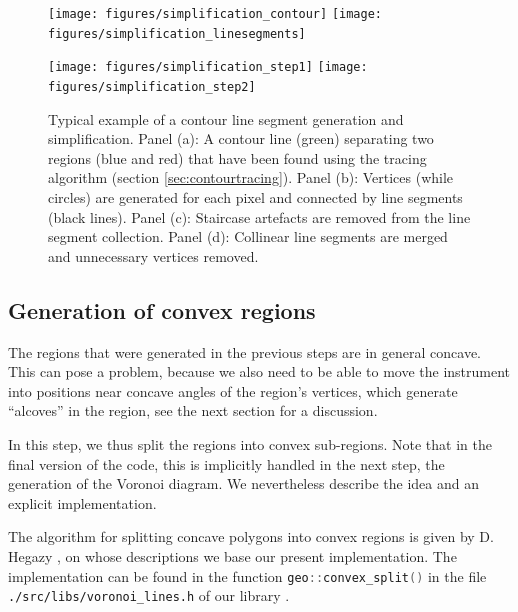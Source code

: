 \begin{figure}
	\texttt{[image: figures/simplification\_contour]}
	\hspace{0.1cm}
	\texttt{[image: figures/simplification\_linesegments]}

	\vspace{0.25cm}

	\texttt{[image: figures/simplification\_step1]}
	\hspace{0.1cm}
	\texttt{[image: figures/simplification\_step2]}
	\caption[Contour line segment generation.]{
		Typical example of a contour line segment generation and simplification.
		Panel (a): A contour line (green) separating two regions (blue and red) that have been found using 
			the tracing algorithm (section \ref{sec:contourtracing}).
		Panel (b): Vertices (while circles) are generated for each pixel and connected by line 
			segments (black lines).
		Panel (c): Staircase artefacts are removed from the line segment collection.
		Panel (d): Collinear line segments are merged and unnecessary vertices removed.
		\label{fig:contour_simplification}}
\end{figure}



\subsection{Generation of convex regions}
\label{sec:convex_regions}
The regions that were generated in the previous steps are in general concave. 
This can pose a problem, because we also need to be able to move the instrument into positions near concave angles
of the region's vertices, which generate ``alcoves'' in the region, see the next section for a discussion.

In this step, we thus split the regions into convex sub-regions. 
Note that in the final version of the code, this is implicitly handled in the next step, the generation of 
the Voronoi diagram. We nevertheless describe the idea and an explicit implementation.

The algorithm for splitting concave polygons into convex regions is given by D. Hegazy \cite{Hegazy2014},
on whose descriptions we base our present implementation.
The implementation can be found in the function \lstinline[language=C++]|geo::convex_split()| in the file
\lstinline|./src/libs/voronoi_lines.h| of our library .

